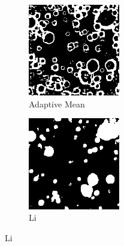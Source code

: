 \documentclass[11pt]{article}
\begin{document}
\begin{figure}[H]
\begin{subfigure}{5cm}
		\centering
		\includegraphics[width=4cm]{files/results/adaptiveMean_mean.png}
		\caption{Adaptive Mean}\hfill
	\end{subfigure}
	\begin{subfigure}[b]{1.0\textwidth}
		\centering
		\includegraphics[width=4cm]{files/results/li.png}
		\caption{Li}\hfill
	\end{subfigure}
	
\end{figure}
\end{document}
